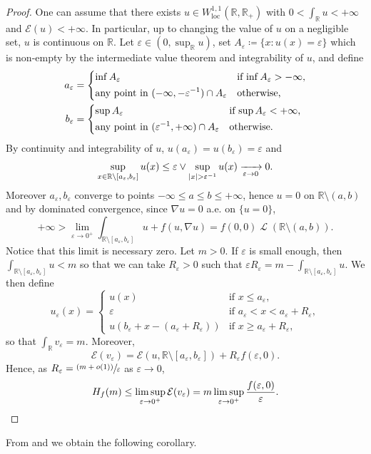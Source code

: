 \documentclass[JEP,XML,SOM,Unicode,published]{cedram}
\newcommand{\psfrac}[2]{{\sfrac{(#1)}{#2}}}
\theoremstyle{plain}
\theoremstyle{definition}
\newcommand{\R}{\mathbb{R}}
\newcommand{\ener}{\mathcal{E}}
\newcommand{\loc}{\mathrm{loc}}
\newcommand{\eps}{\varepsilon}
\DeclarePairedDelimiter{\abs}{\lvert}{\rvert}
\DeclareMathOperator{\lbm}{\mathcal{L}}
\newcommand{\xto}[2][]{\xrightarrow[#2]{#1}}
\begin{document}
\begin{proof}
One can assume that there exists \(u\in W^{1,1}_\loc(\R,\R_+)\) with \(0<\int_\R u<+\infty\) and \(\ener(u)<+\infty\). In particular, up to changing the value of \(u\) on a negligible set, \(u\) is continuous on \(\R\). Let \(\eps\in(0,\sup_\R u)\), set $A_\eps \coloneqq \{x : u(x) = \eps\}$ which is non-empty by the intermediate value theorem and integrability of $u$, and define
\begin{align*}
a_\eps &= \begin{dcases*}
\inf A_\eps & if $\inf A_\eps >-\infty$,\\
\text{any point in } (-\infty,-\eps^{-1}) \cap A_\eps & otherwise,
\end{dcases*}\\
b_\eps &=\begin{dcases*}
\sup A_\eps & if $\sup A_\eps <+\infty$,\\
\text{any point in } (\eps^{-1},+\infty) \cap A_\eps & otherwise.
\end{dcases*}
\end{align*}
By continuity and integrability of $u$, \(u(a_\eps) = u(b_\eps) =\eps\) and
\[\sup_{x\in\R\setminus [a_\eps,b_\eps]} u(x) \leq \eps \vee \sup_{\abs{x}> \eps^{-1}} u(x) \xto{\eps \to 0} 0.\]
Moreover $a_\eps,b_\eps$ converge to points $-\infty\leq a \leq b \leq +\infty$, hence $u = 0$ on $\R\setminus(a,b)$ and by dominated convergence, since \(\nabla u=0\) a.e. on \(\{u=0\}\),
\[
+\infty > \lim_{\eps\to 0^+}\int_{\R\setminus [a_\eps,b_\eps]}u+f(u,\nabla u) = f(0,0)\lbm(\R\setminus(a,b)).
\]
Notice that this limit is necessary zero. Let \(m>0\). If \(\eps\) is small enough, then \(\int_{\R\setminus [a_\eps,b_\eps]} u<m\) so that we can take \(R_\eps>0\) such that \(\eps R_\eps=m- \int_{\R\setminus [a_\eps,b_\eps]} u\). We then define
\[
u_\eps(x)=
\begin{cases}
u(x)&\text{if \(x\leq a_\eps\),}\\
\eps&\text{if \(a_\eps< x< a_\eps+R_\eps\)},\\
u(b_\eps+x-(a_\eps+R_\eps))&\text{if \(x\geq a_\eps+R_\eps\),}
\end{cases}
\]
so that \(\int_\R v_\eps=m\). Moreover,
\[
\ener(v_\eps)=\ener(u,\R\setminus [a_\eps,b_\eps])+R_\eps f(\eps,0).
\]
Hence, as \(R_\eps=\psfrac{m+o(1)}{\eps}\) as \(\eps\to 0\),
\[
H_f(m)\leq \limsup_{\eps\to 0^+}\ener(v_\eps)
= m\limsup_{\eps\to 0^+}\frac{f(\eps,0)}{\eps}.\qedhere
\]
\end{proof}

From  and  we obtain the following corollary.
\end{document}
